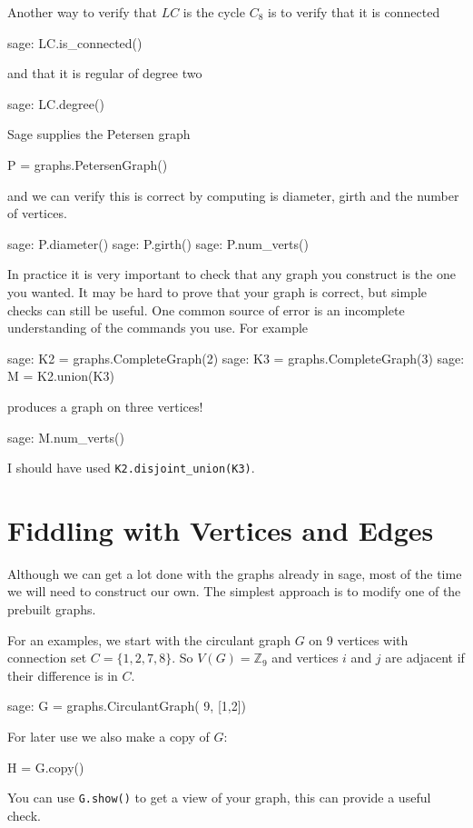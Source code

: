 {Another way to verify that $LC$ is the cycle $C_8$ is to verify that it
is connected
\begin{sageexample}
    sage: LC.is_connected()
\end{sageexample}
and that it is regular of degree two
\begin{sageexample}
    sage: LC.degree()
\end{sageexample}
Sage supplies the Petersen graph
\begin{sageblock}
    P = graphs.PetersenGraph()
\end{sageblock}
and we can verify this is correct by computing is diameter, girth
and the number of vertices.
\begin{sageexample}
    sage: P.diameter()
    sage: P.girth()
    sage: P.num_verts()
\end{sageexample}

In practice it is very important to check that any graph you construct is
the one you wanted.  It may be hard to prove that your graph is correct,
but simple checks can still be useful. One common source of error is an incomplete
understanding of the commands you use.  For example
\begin{sageexample}
    sage: K2 = graphs.CompleteGraph(2)
    sage: K3 = graphs.CompleteGraph(3)
    sage: M = K2.union(K3)
\end{sageexample}               
produces a graph on three vertices!
\begin{sageexample}
    sage: M.num_verts()
\end{sageexample}
I should have used \verb|K2.disjoint_union(K3)|.


\section{Fiddling with Vertices and Edges}

Although we can get a lot done with the graphs already in sage, most of the time
we will need to construct our own. The simplest approach is to modify one of 
the prebuilt graphs.

For an examples, we start with the circulant graph $G$ on 9 vertices
with connection set $C=\{1,2,7,8\}$. So $V(G)=\mathbb{Z}_9$ and
vertices $i$ and $j$ are adjacent if their difference is in $C$.
\begin{sageexample}
    sage: G = graphs.CirculantGraph( 9, [1,2])
\end{sageexample}
For later use we also make a copy of $G$:
\begin{sageblock}
    H = G.copy()
\end{sageblock}
You can use \verb|G.show()| to get a view of your graph, this can provide
a useful check.

}
